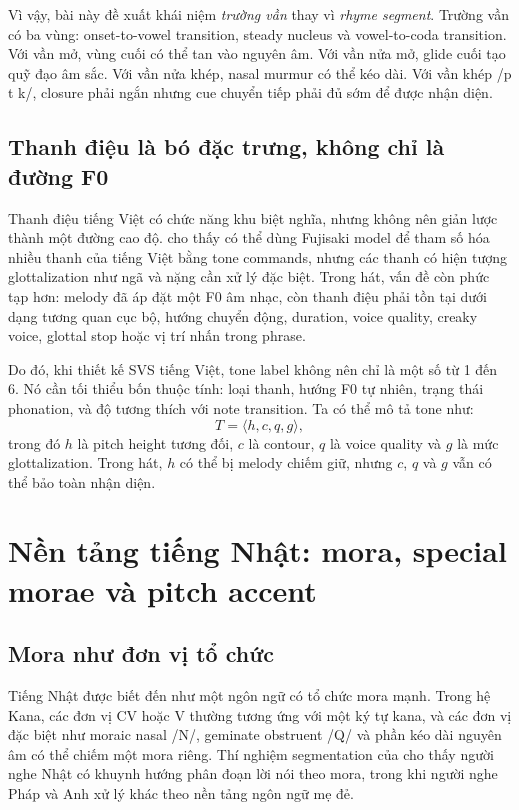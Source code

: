 \documentclass[12pt,a4paper]{article}
\newcommand{\term}[1]{\textit{#1}}
\begin{document}
Vì vậy, bài này đề xuất khái niệm 
\term{trường vần} thay vì 
\term{rhyme segment}. Trường vần có ba vùng: onset-to-vowel transition, steady nucleus và vowel-to-coda transition. Với vần mở, vùng cuối có thể tan vào nguyên âm. Với vần nửa mở, glide cuối tạo quỹ đạo âm sắc. Với vần nửa khép, nasal murmur có thể kéo dài. Với vần khép /p t k/, closure phải ngắn nhưng cue chuyển tiếp phải đủ sớm để được nhận diện.

\subsection{Thanh điệu là bó đặc trưng, không chỉ là đường F0}

Thanh điệu tiếng Việt có chức năng khu biệt nghĩa, nhưng không nên giản lược thành một đường cao độ. \textcite{mixdorff2003vietnameseTones} cho thấy có thể dùng Fujisaki model để tham số hóa nhiều thanh của tiếng Việt bằng tone commands, nhưng các thanh có hiện tượng glottalization như ngã và nặng cần xử lý đặc biệt. Trong hát, vấn đề còn phức tạp hơn: melody đã áp đặt một F0 âm nhạc, còn thanh điệu phải tồn tại dưới dạng tương quan cục bộ, hướng chuyển động, duration, voice quality, creaky voice, glottal stop hoặc vị trí nhấn trong phrase.

Do đó, khi thiết kế SVS tiếng Việt, tone label không nên chỉ là một số từ 1 đến 6. Nó cần tối thiểu bốn thuộc tính: loại thanh, hướng F0 tự nhiên, trạng thái phonation, và độ tương thích với note transition. Ta có thể mô tả tone như:
\[
T = \langle h, c, q, g \rangle,
\]
trong đó $h$ là pitch height tương đối, $c$ là contour, $q$ là voice quality và $g$ là mức glottalization. Trong hát, $h$ có thể bị melody chiếm giữ, nhưng $c$, $q$ và $g$ vẫn có thể bảo toàn nhận diện.

\section{Nền tảng tiếng Nhật: mora, special morae và pitch accent}

\subsection{Mora như đơn vị tổ chức}

Tiếng Nhật được biết đến như một ngôn ngữ có tổ chức mora mạnh. Trong hệ Kana, các đơn vị CV hoặc V thường tương ứng với một ký tự kana, và các đơn vị đặc biệt như moraic nasal /N/, geminate obstruent /Q/ và phần kéo dài nguyên âm có thể chiếm một mora riêng. Thí nghiệm segmentation của \textcite{otake1993mora} cho thấy người nghe Nhật có khuynh hướng phân đoạn lời nói theo mora, trong khi người nghe Pháp và Anh xử lý khác theo nền tảng ngôn ngữ mẹ đẻ.
\end{document}
